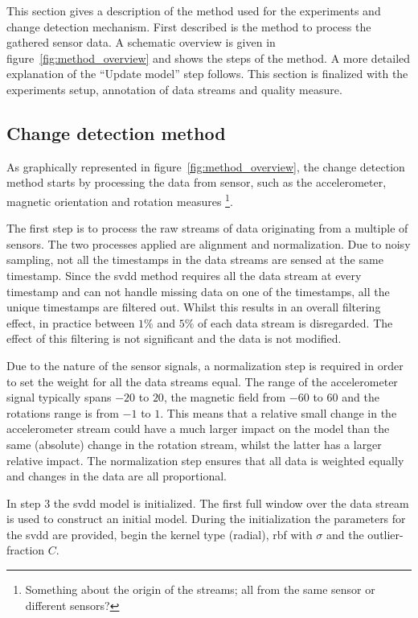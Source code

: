 This section gives a description of the method used for the experiments and change detection mechanism.
First described is the method to process the gathered sensor data.
A schematic overview is given in figure~\ref{fig:method_overview} and shows the steps of the method.
A more detailed explanation of the ``Update model'' step follows.
This section is finalized with the experiments setup, annotation of data streams and quality measure.

\subsection{Change detection method}
As graphically represented in figure~\ref{fig:method_overview}, the change detection method starts by processing the data from sensor, such as the accelerometer, magnetic orientation and rotation measures \footnote{Something about the origin of the streams; all from the same sensor or different sensors?}.

The first step is to process the raw streams of data originating from a multiple of sensors.
The two processes applied are alignment and normalization.
Due to noisy sampling, not all the timestamps in the data streams are sensed at the same timestamp.
Since the \gls{svdd} method requires all the data stream at every timestamp and can not handle missing data on one of the timestamps, all the unique timestamps are filtered out.
Whilst this results in an overall filtering effect, in practice between $1\%$ and $5\%$ of each data stream is disregarded.
The effect of this filtering is not significant and the data is not modified.

Due to the nature of the sensor signals, a normalization step is required in order to set the weight for all the data streams equal.
The range of the accelerometer signal typically spans $-20$ to $20$, the magnetic field from $-60$ to $60$ and the rotations range is from $-1$ to $1$.
This means that a relative small change in the accelerometer stream could have a much larger impact on the model than the same (absolute) change in the rotation stream, whilst the latter has a larger relative impact.
The normalization step ensures that all data is weighted equally and changes in the data are all proportional.

In step $3$ the \gls{svdd} model is initialized.
The first full window over the data stream is used to construct an initial model.
During the initialization the parameters for the \gls{svdd} are provided, begin the kernel type (radial), \gls{rbf} with $\sigma$ and the outlier-fraction $C$.

